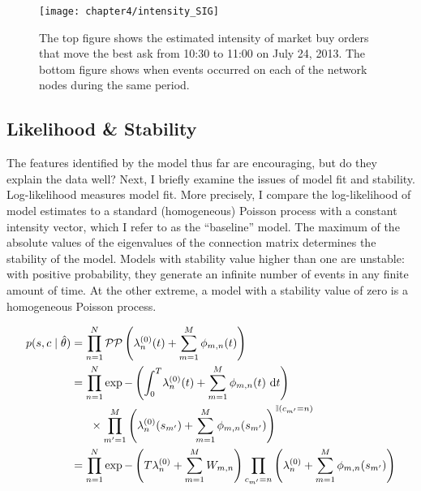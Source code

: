 		\begin{figure}[t!]
			\small
			\linespread{1}
			\centering
			\texttt{[image: chapter4/intensity\_SIG]}
			\captionsetup{skip=-20pt, labelsep=colon, font=footnotesize, width=\linewidth}
			\caption[Fitted intensity: SIG]{The top figure shows the estimated intensity of market buy orders that move the best ask from 10:30 to 11:00 on July 24, 2013. The bottom figure shows when events occurred on each of the network nodes during the same period.}
			\label{fig:intensity_SIG}
		\end{figure}

	\subsection{Likelihood \& Stability}
		The features identified by the model thus far are encouraging, but do they explain the data well? Next, I briefly examine the issues of model fit and stability. Log-likelihood measures model fit. More precisely, I compare the log-likelihood of model estimates to a standard (homogeneous) Poisson process with a constant intensity vector, which I refer to as the “baseline” model. The maximum of the absolute values of the eigenvalues of the connection matrix determines the stability of the model. Models with stability value higher than one are unstable: with positive probability, they generate an infinite number of events in any finite amount of time. At the other extreme, a model with a stability value of zero is a homogeneous Poisson process.

		\begin{align}
			p(s, c \mid \hat{\theta}) &= \prod_{n=1}^{N} \mathcal{PP} \left( \lambda_n^{(0)}(t) + \sum_{m=1}^{M} \phi_{m , n}(t) \right) \notag \\
			&= \prod_{n=1}^N \exp -\left( \int_{0}^{T} \! \lambda_n^{(0)}(t) + \sum_{m=1}^{M} \phi_{m , n}(t) \ \mathrm{d}t \right) \notag \\
			& \ \ \ \ \ \times \prod_{m'=1}^M \left( \lambda_n^{(0)}(s_{m'}) + \sum_{m=1}^{M} \phi_{m , n}(s_{m'}) \right)^{\mathbb{I} (c_{m'} = n)} \notag \\
			&= \prod_{n=1}^N \exp -\left(T \lambda_n^{(0)} + \sum_{m=1}^M W_{m,n} \right) \prod_{c_{m'}=n} \left( \lambda_n^{(0)} + \sum_{m=1}^{M} \phi_{m , n}(s_{m'}) \right)
		\end{align}

